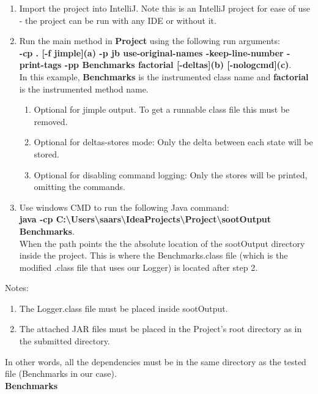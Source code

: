 \documentclass[10pt]{article}
\begin{document}
\begin{enumerate}
\item Import the project into IntelliJ. Note this is an IntelliJ project for ease of use - the project can be run with any IDE or without it.
\item Run the main method in \textbf{Project} using the following run arguments:\\
\textbf{-cp . [-f jimple](a) -p jb use-original-names -keep-line-number -print-tags -pp Benchmarks factorial [-deltas](b) [-nologcmd](c)}.\\
In this example, \textbf{Benchmarks} is the instrumented class name and \textbf{factorial} is the instrumented method name.\\
\begin{enumerate}
\item Optional for jimple output. To get a runnable class file this must be removed.
\item Optional for deltas-stores mode: Only the delta between each state will be stored.
\item Optional for disabling command logging: Only the stores will be printed, omitting the commands.
\end{enumerate}    

\item Use windows CMD to run the following Java command:\\
\textbf{java -cp C:\textbackslash Users\textbackslash saars\textbackslash IdeaProjects\textbackslash Project\textbackslash sootOutput Benchmarks}.\\
When the path points the the absolute location of the sootOutput directory inside the project. This is where the Benchmarks.class file (which is the modified .class file that uses our Logger) is located after step 2. \\
\end{enumerate}    
Notes:
\begin{enumerate}
\item The Logger.class file must be placed inside sootOutput.
\item The attached JAR files must be placed in the Project's root directory as in the submitted directory.
\end{enumerate} 
In other words, all the dependencies must be in the same directory as the tested file (Benchmarks in our case). \\
\newpage
\textbf{Benchmarks}
\end{document}
